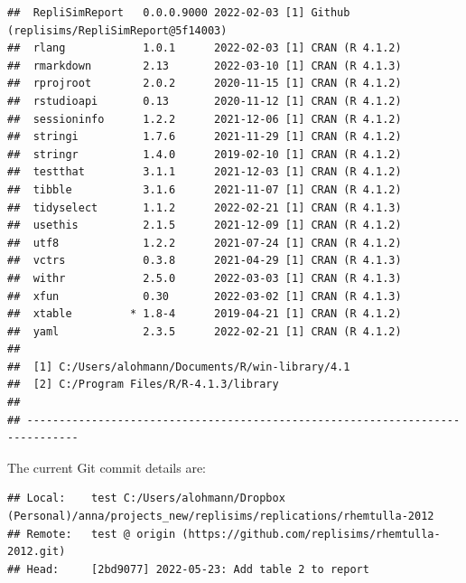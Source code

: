 \documentclass[10,a4paperpaper,]{article}
\begin{document}
\begin{verbatim}
##  RepliSimReport   0.0.0.9000 2022-02-03 [1] Github (replisims/RepliSimReport@5f14003)
##  rlang            1.0.1      2022-02-03 [1] CRAN (R 4.1.2)
##  rmarkdown        2.13       2022-03-10 [1] CRAN (R 4.1.3)
##  rprojroot        2.0.2      2020-11-15 [1] CRAN (R 4.1.2)
##  rstudioapi       0.13       2020-11-12 [1] CRAN (R 4.1.2)
##  sessioninfo      1.2.2      2021-12-06 [1] CRAN (R 4.1.2)
##  stringi          1.7.6      2021-11-29 [1] CRAN (R 4.1.2)
##  stringr          1.4.0      2019-02-10 [1] CRAN (R 4.1.2)
##  testthat         3.1.1      2021-12-03 [1] CRAN (R 4.1.2)
##  tibble           3.1.6      2021-11-07 [1] CRAN (R 4.1.2)
##  tidyselect       1.1.2      2022-02-21 [1] CRAN (R 4.1.3)
##  usethis          2.1.5      2021-12-09 [1] CRAN (R 4.1.2)
##  utf8             1.2.2      2021-07-24 [1] CRAN (R 4.1.2)
##  vctrs            0.3.8      2021-04-29 [1] CRAN (R 4.1.3)
##  withr            2.5.0      2022-03-03 [1] CRAN (R 4.1.3)
##  xfun             0.30       2022-03-02 [1] CRAN (R 4.1.3)
##  xtable         * 1.8-4      2019-04-21 [1] CRAN (R 4.1.2)
##  yaml             2.3.5      2022-02-21 [1] CRAN (R 4.1.2)
## 
##  [1] C:/Users/alohmann/Documents/R/win-library/4.1
##  [2] C:/Program Files/R/R-4.1.3/library
## 
## ------------------------------------------------------------------------------
\end{verbatim}

The current Git commit details are:

\begin{verbatim}
## Local:    test C:/Users/alohmann/Dropbox (Personal)/anna/projects_new/replisims/replications/rhemtulla-2012
## Remote:   test @ origin (https://github.com/replisims/rhemtulla-2012.git)
## Head:     [2bd9077] 2022-05-23: Add table 2 to report
\end{verbatim}
\end{document}
